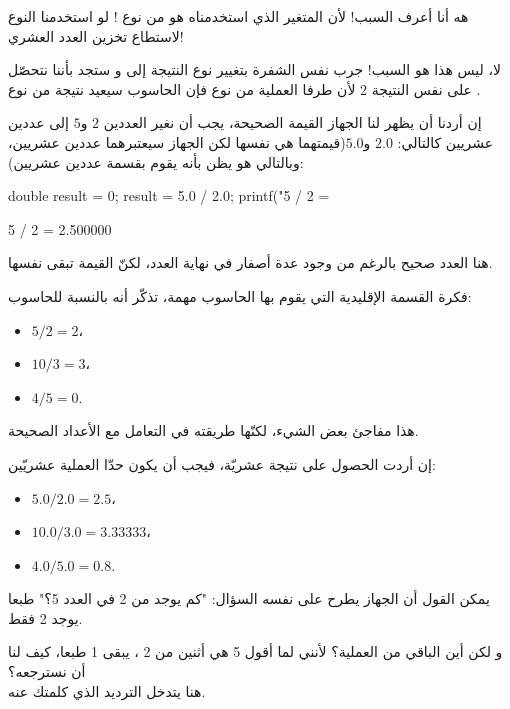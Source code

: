 \begin{question}
  هه أنا أعرف السبب! لأن المتغير
  الذي استخدمناه هو من نوع
  !
  لو استخدمنا النوع
  لاستطاع تخزين العدد العشري!
\end{question}

لا، ليس هذا هو السبب! جرب  نفس الشفرة بتغيير نوع النتيجة إلى
و ستجد بأننا نتحصّل على نفس النتيجة 2 لأن طرفا العملية من نوع
فإن الحاسوب سيعيد نتيجة من نوع
.

إن أردنا أن يظهر لنا الجهاز القيمة الصحيحة، يجب أن نغير العددين $ 2 $ و$ 5 $ إلى عددين عشريين كالتالي: $ 2.0 $ و$ 5.0  $(قيمتهما هي نفسها لكن الجهاز سيعتبرهما عددين عشريين، وبالتالي هو يظن بأنه يقوم بقسمة عددين عشريين):

\begin{Csource}
  double result = 0;
  result = 5.0 / 2.0;
  printf("5 / 2 =  %
\end{Csource}

\begin{Console}
  5 / 2 = 2.500000
\end{Console}

هنا العدد صحيح بالرغم من وجود عدة أصفار في نهاية العدد، لكنّ القيمة تبقى نفسها.

فكرة القسمة الإقليدية التي يقوم بها الحاسوب مهمة، تذكّر أنه بالنسبة للحاسوب:

\begin{itemize}
  \item $ 5 / 2 = 2 $،
  \item $ 10 / 3 = 3 $،
  \item $ 4 / 5 = 0 $.
\end{itemize}

هذا مفاجئ بعض الشيء، لكنّها طريقته في التعامل مع الأعداد الصحيحة.

إن أردت الحصول على نتيجة عشريّة، فيجب أن يكون حدّا العملية عشريّين:

\begin{itemize}
  \item $ 5.0 / 2.0 = 2.5 $،
  \item $ 10.0 / 3.0 = 3.33333 $،
  \item $ 4.0 / 5.0 = 0.8 $.
\end{itemize}

يمكن القول أن الجهاز يطرح على نفسه السؤال: "كم يوجد من 2 في العدد 5؟" طبعا يوجد 2 فقط.

و لكن أين الباقي من العملية؟ لأنني لما أقول 5 هي أثنين من 2 ، يبقى 1 طبعا، كيف لنا أن نسترجعه؟\\
هنا يتدخل الترديد الذي كلمتك عنه.

